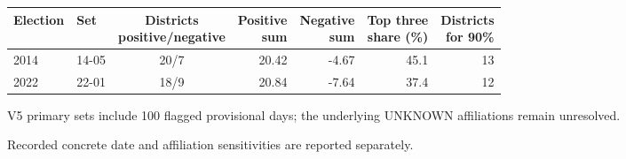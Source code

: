 \begin{tabular}{llcrrrr}
\toprule
Election & Set &
\shortstack{Districts\\positive/negative} &
\shortstack{Positive\\sum} &
\shortstack{Negative\\sum} &
\shortstack{Top three\\share (\%)} &
\shortstack{Districts\\for 90\%} \\ 
\midrule
2014 & 14-05 & 20/7 & 20.42 & -4.67 & 45.1 & 13 \\
2022 & 22-01 & 18/9 & 20.84 & -7.64 & 37.4 & 12 \\
\bottomrule
\end{tabular}

\par{\footnotesize V5 primary sets include 100 flagged provisional days; the underlying UNKNOWN affiliations remain unresolved.}\par{\footnotesize Recorded concrete date and affiliation sensitivities are reported separately.}
